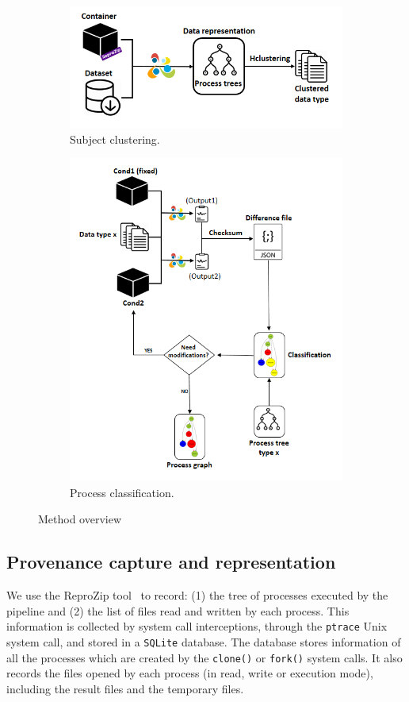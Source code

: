 \documentclass[a4paper,num-refs]{oup-contemporary}
\newcommand{\reprozip}[0]{ReproZip\xspace}
\begin{document}
\begin{figure}
  \centering
  \begin{subfigure}{\columnwidth}
    \centering
    \includegraphics[width=.7\columnwidth]{images/Slide1}
    \caption{Subject clustering.}
    \label{fig:overview-cluster}
  \end{subfigure}
   \begin{subfigure}{\columnwidth}
    \centering
     \includegraphics[width=.75\columnwidth]{images/Slide2}
     \caption{Process classification.}
     \label{fig:overview-classify}
   \end{subfigure}
   \caption{Method overview}
   \label{fig:overview}
  \end{figure}

\subsection{Provenance capture and representation}

We use the \reprozip tool~\cite{Chirigati2016} to record: (1) 
the tree of processes executed by the pipeline and (2) the list of 
files read and written by each process. This information is collected 
by system call interceptions, through the \texttt{ptrace} Unix system 
call, and stored in a \texttt{SQLite} database. The database stores 
information of all the processes which are created by the 
\texttt{clone()} or \texttt{fork()} system calls. It also records the 
files opened by each process (in read, write or execution mode), 
including the result files and the temporary files.
\end{document}
